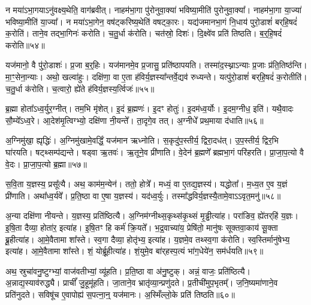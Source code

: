 न मया॑\-ऽभा॒गया\-ऽनु॑वक्ष्य॒थेति॒ वाग॑ब्रवीत्।
नाहम॑भा॒गा पु॑रोनुवा॒क्या॑ भविष्या॒मीति॑ पुरोनुवा॒क्या᳚।
नाहम॑भा॒गा या॒ज्या॑ भविष्या॒मीति॑ या॒ज्या᳚।
न मया॑\-ऽभा॒गेन॒ वष॑ट्करिष्य॒थेति॑ वषट्का॒रः।
यद्य॑जमानभा॒गं नि॒धाय॑ पुरो॒डाशं॑ बर्‌\mbox{}हि॒षदं॑ क॒रोति॑।
ताने॒व तद्भा॒गिनः॑ करोति।
च॒तु॒र्धा क॑रोति।
चत॑स्रो॒ दिशः॑।
दि॒क्ष्वे॑व प्रति॑ तिष्ठति।
ब॒र्॒हि॒षदं॑ करोति॥५४॥\ip

यज॑मानो॒ वै पु॑रो॒डाशः॑।
प्र॒जा ब॒र्॒हिः।
यज॑मानमे॒व प्र॒जासु॒ प्रति॑\-ष्ठापयति।
तस्मा॑द॒स्थ्ना\-ऽन्याः प्र॒जाः प्र॑ति॒तिष्ठ॑न्ति।
मा॒ꣳ॒\-सेना॒न्याः।
अथो॒ खल्वा॑हुः।
दक्षि॑णा॒ वा ए॒ता ह॑विर्य॒ज्ञस्या᳚न्तर्वे॒द्यव॑ रुध्यन्ते।
यत्पु॑रो॒डाशं॑ बर्‌\mbox{}हि॒षदं॑ क॒रोतीति॑।
च॒तु॒र्धा क॑रोति।
च॒त्वारो॒ ह्ये॑ते ह॑विर्य॒ज्ञस्य॒र्त्विजः॑॥५५॥\ip

ब्र॒ह्मा होता᳚\-ऽध्व॒र्युर॒ग्नीत्।
तम॒भि मृ॑शेत्।
इ॒दं ब्र॒ह्मणः॑।
इ॒दꣳ होतुः॑।
इ॒दम॑ध्व॒र्योः।
इ॒दम॒ग्नीध॒ इति॑।
यथै॒वादः सौ॒म्ये᳚\-ऽध्व॒रे।
आ॒देश॑मृ॒त्विग्भ्यो॒ दक्षि॑णा नी॒यन्ते᳚।
ता॒दृगे॒व तत्।
अ॒ग्नीधे᳚ प्रथ॒माया द॑धाति॥५६॥\ip

अ॒ग्निमु॑खा॒ ह्यृद्धिः॑।
अ॒ग्निमु॑खामे॒वर्द्धिं॒ यज॑मान ऋध्नोति।
स॒कृदु॑प॒स्तीर्य॒ द्विरा॒दध॑त्।
उ॒प॒स्तीर्य॒ द्विर॒भि घा॑रयति।
षट्थ्सम्प॑द्यन्ते।
षड्वा ऋ॒तवः॑।
ऋ॒तूने॒व प्री॑णाति।
वे॒देन॑ ब्र॒ह्मणे᳚ ब्रह्मभा॒गं परि॑हरति।
प्रा॒जा॒प॒त्यो वै वे॒दः।
प्रा॒जा॒प॒त्यो ब्र॒ह्मा॥५७॥\ip

स॒वि॒ता य॒ज्ञस्य॒ प्रसू᳚त्यै।
अथ॒ काम॑म॒न्येन॑।
ततो॒ होत्रे᳚।
मध्यं॒ वा ए॒तद्य॒ज्ञस्य॑।
यद्धोता᳚।
म॒ध्य॒त ए॒व य॒ज्ञं प्री॑णाति।
अथा᳚ध्व॒र्यवे᳚।
प्र॒ति॒ष्ठा वा ए॒षा य॒ज्ञस्य॑।
यद॑ध्व॒र्युः।
तस्मा᳚द्धविर्य॒ज्ञस्यै॒तामे॒वाऽऽवृत॒मनु॑॥५८॥\ip

अ॒न्या दक्षि॑णा नीयन्ते।
य॒ज्ञस्य॒ प्रति॑\-ष्ठित्यै।
अ॒ग्निम॑ग्नीथ्स॒कृथ्स॑\-कृ॒थ्सं मृ॒ड्ढीत्या॑ह।
परा॑ङिव॒ ह्ये॑तर्‌\mbox{}हि॑ य॒ज्ञः।
इ॒षि॒ता दैव्या॒ होता॑र॒ इत्या॑ह।
इ॒षि॒तꣳ हि कर्म॑ क्रि॒यते᳚।
भ॒द्र॒वाच्या॑य॒ प्रेषि॑तो॒ मानु॑षः सूक्तवा॒काय॑ सू॒क्ता ब्रू॒हीत्या॑ह।
आ॒\-मे॒वैतामा शा᳚स्ते।
स्व॒गा दैव्या॒ होतृ॑भ्य॒ इत्या॑ह।
य॒ज्ञमे॒व तथ्स्व॒गा क॑रोति।
स्व॒स्तिर्मानु॑षेभ्य॒ इत्या॑ह।
आ॒\-मे॒वैतामा शा᳚स्ते।
शं॒ योर्ब्रू॒हीत्या॑ह।
शं॒युमे॒व बा॑र्‌\mbox{}हस्प॒त्यं भा॑ग॒धेये॑न॒ सम॑र्धयति॥५९॥\ip{}

अथ॒ स्रुचा॑वनु॒ष्टुग्भ्यां॒ वाज॑वतीभ्यां॒ व्यू॑हति।
प्र॒ति॒ष्ठा वा अ॑नु॒ष्टुक्।
अन्नं॒ वाजः॒ प्रति॑\-ष्ठित्यै।
अ॒न्नाद्य॒स्या\-व॑\-रुद्ध्यै।
प्राचीं᳚ जु॒हूमू॑हति।
जा॒ताने॒व भ्रातृ॑व्या॒न्प्रणु॑दते।
प्र॒तीची॑मुप॒भृतम्᳚।
ज॒नि॒ष्यमा॑णाने॒व प्रति॑\-नुदते।
सविषू॑च ए॒वापोह्य॑ स॒पत्ना॒न्॒ यज॑मानः।
अ॒स्मिँल्लो॒के प्रति॑ तिष्ठति॥६०॥\ip

